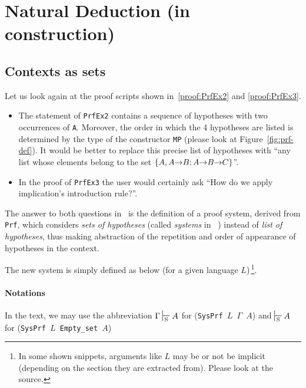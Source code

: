 \chapter{Natural Deduction (in construction)}


\section{Contexts as sets}

Let us look again at the proof scripts shown in~\vref{proof:PrfEx2} and \vref{proof:PrfEx3}.
\begin{itemize}
\item The statement of \texttt{PrfEx2} contains a sequence
of hypotheses with two occurrences of \texttt{A}. Moreover, the order in which the 4 hypotheses are listed is determined by the type of the constructor \texttt{MP}  (please look at
Figure~\vref{fig:prf-def}). It would be better to replace this
precise list of hypotheses with ``any list whose elements
belong to the set $\{A, A \mbox{$\rightarrow$} B; A \mbox{$\rightarrow$} B \mbox{$\rightarrow$} C\}$''.

\item In the proof of \texttt{PrfEx3} the \coq user would certainly ask ``How do we apply implication's introduction rule?''.
\end{itemize}

The answer to both questions in~\cite{Goedel}  is the definition of a proof system, derived from \texttt{Prf}, which considers
\emph{sets of hypotheses} (called \emph{systems} in ~\cite{Goedel}) instead of
\emph{list of hypotheses}, thus making abstraction of
the repetition and order of appearance of hypotheses in the context.

The new system is simply defined as below (for  a given language $L$)\,\footnote{In some shown snippets, arguments like $L$ may be or not be implicit (depending on the section they are extracted from). Please look at the \coq source.}.




\subsubsection{Notations}

In the text, we may use the abbreviation $\Gamma \sdash A$ for
(\texttt{SysPrf $L$ $\Gamma$ $A$}) and
$\sdash A$ for
(\texttt{SysPrf $L$ Empty\_set $A$}) 




